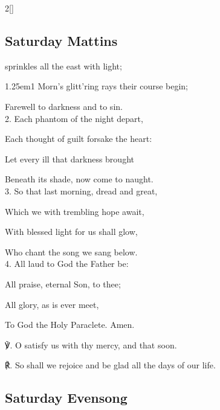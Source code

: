 \begin{paracol}{2}[]
\sloppy

\subsection{Saturday Mattins}\label{SaturdayMattins}

 sprinkles all the east with light;
	

\begin{hangparas}{1.25em}{1}
Morn's glitt'ring rays their course begin;

Farewell to darkness and to sin.\\

2. Each phantom of the night depart,

Each thought of guilt forsake the heart:

Let every ill that darkness brought

Beneath its shade, now come to naught.\\

3. So that last morning, dread and great,

Which we with trembling hope await,

With blessed light for us shall glow,

Who chant the song we sang below.\\

4. All laud to God the Father be:

All praise, eternal Son, to thee;

All glory, as is ever meet,

To God the Holy Paraclete. Amen.\\
\end{hangparas}

℣. O satisfy us with thy mercy, and that soon.

℟. So shall we rejoice and be glad all the days of our life.


\switchcolumn

\subsection{Saturday Evensong}\label{SaturdayEvensong}


\end{paracol}
